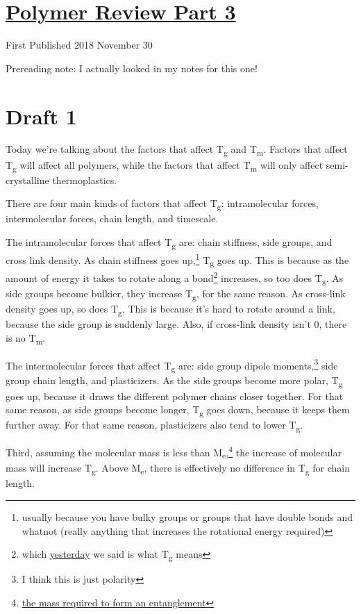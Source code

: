 \documentclass[12pt]{article}[titlepage]
\newcommand{\1}{\={a}}
\newcommand{\2}{\={e}}
\newcommand{\3}{\={\i}}
\newcommand{\4}{\=o}
\newcommand{\5}{\=u}
\newcommand{\6}{\={A}}
\newcommand{\sub}[1]{\textsubscript{#1}}
\renewcommand{\,}{\textsuperscript{,}}
\begin{document}
\doublespacing
\section{\href{polymer-3.html}{Polymer Review Part 3}}
First Published 2018 November 30

Prereading note: I actually looked in my notes for this one!

\section{Draft 1}
Today we're talking about the factors that affect T\sub{g} and T\sub{m}.
Factors that affect T\sub{g} will affect all polymers, while the factors that affect T\sub{m} will only affect semi-crystalline thermoplastics.

There are four main kinds of factors that affect T\sub{g}: intramolecular forces, intermolecular forces, chain length, and timescale.

The intramolecular forces that affect T\sub{g} are: chain stiffness, side groups, and cross link density.
As chain stiffness goes up,\footnote{usually because you have bulky groups or groups that have double bonds and whatnot (really anything that increases the rotational energy required)} T\sub{g} goes up.
This is because as the amount of energy it takes to rotate along a bond\footnote{which \href{polymer-2.html}{yesterday} we said is what T\sub{g} means} increases, so too does T\sub{g}. 
As side groups become bulkier, they increase T\sub{g}, for the same reason.
As cross-link density goes up, so does T\sub{g}, 
This is because it's hard to rotate around a link, because the side group is suddenly large.
Also, if cross-link density isn't 0, there is no T\sub{m}.

The intermolecular forces that affect T\sub{g} are: side group dipole moments,\footnote{I think this is just polarity} side group chain length, and plasticizers.
As the side groups become more polar, T\sub{g} goes up, because it draws the different polymer chains closer together.
For that same reason, as side groups become longer, T\sub{g} goes down, because it keeps them further away.
For that same reason, plasticizers also tend to lower T\sub{g}.

Third, assuming the molecular mass is less than M\sub{e},\footnote{\href{polymer-1.html}{the mass required to form an entanglement}} the increase of molecular mass will increase T\sub{g}.
Above M\sub{e}, there is effectively no difference in T\sub{g} for chain length.
\end{document}
